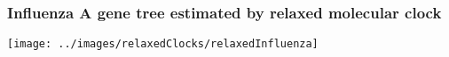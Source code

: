 \begin{frame}[plain]
\frametitle{Influenza A gene tree estimated by relaxed molecular clock}

\begin{centering}

\texttt{[image: ../images/relaxedClocks/relaxedInfluenza]}

\end{centering}

\end{frame}